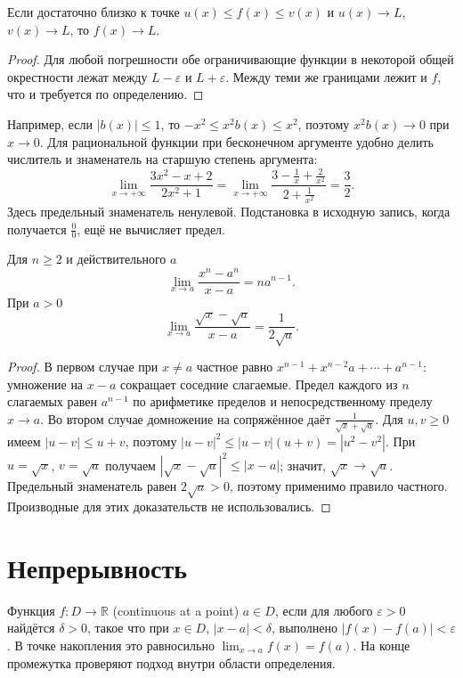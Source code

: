 \begin{theorem}\label{thm:legacy-c19-4}
Если достаточно близко к точке \(u(x)\le f(x)\le v(x)\) и \(u(x)\to L\), \(v(x)\to L\), то \(f(x)\to L\).
\end{theorem}
\begin{proof}
Для любой погрешности обе ограничивающие функции в некоторой общей окрестности лежат между \(L-\varepsilon\) и \(L+\varepsilon\). Между теми же границами лежит и \(f\), что и требуется по определению.
\end{proof}

Например, если \(|b(x)|\le1\), то \(-x^2\le x^2b(x)\le x^2\), поэтому \(x^2b(x)\to0\) при \(x\to0\). Для рациональной функции при бесконечном аргументе удобно делить числитель и знаменатель на старшую степень аргумента:
\[
\lim_{x\to+\infty}\frac{3x^2-x+2}{2x^2+1}
=\lim_{x\to+\infty}\frac{3-\frac1x+\frac2{x^2}}{2+\frac1{x^2}}
=\frac32.
\]
Здесь предельный знаменатель ненулевой. Подстановка в исходную запись, когда получается \(\frac00\), ещё не вычисляет предел.

\begin{theorem}\label{thm:legacy-c19-5}
Для \(n\ge2\) и действительного \(a\)
\[
\lim_{x\to a}\frac{x^n-a^n}{x-a}=na^{n-1}.
\]
При \(a>0\)
\[
\lim_{x\to a}\frac{\sqrt x-\sqrt a}{x-a}=\frac1{2\sqrt a}.
\]
\end{theorem}
\begin{proof}
В первом случае при \(x\ne a\) частное равно \(x^{n-1}+x^{n-2}a+\cdots+a^{n-1}\): умножение на \(x-a\) сокращает соседние слагаемые. Предел каждого из \(n\) слагаемых равен \(a^{n-1}\) по арифметике пределов и непосредственному пределу \(x\to a\). Во втором случае домножение на сопряжённое даёт \(\frac1{\sqrt x+\sqrt a}\). Для \(u,v\ge0\) имеем \(|u-v|\le u+v\), поэтому \(|u-v|^2\le|u-v|(u+v)=|u^2-v^2|\). При \(u=\sqrt x\), \(v=\sqrt a\) получаем \(|\sqrt x-\sqrt a|^2\le|x-a|\); значит, \(\sqrt x\to\sqrt a\). Предельный знаменатель равен \(2\sqrt a>0\), поэтому применимо правило частного. Производные для этих доказательств не использовались.
\end{proof}

\section{Непрерывность}

\begin{definition}
Функция \(f:D\to\mathbb R\)  (continuous at a point) \(a\in D\), если для любого \(\varepsilon>0\) найдётся \(\delta>0\), такое что при \(x\in D\), \(|x-a|<\delta\), выполнено \(|f(x)-f(a)|<\varepsilon\). В точке накопления это равносильно \(\lim_{x\to a}f(x)=f(a)\). На конце промежутка проверяют подход внутри области определения.
\end{definition}

